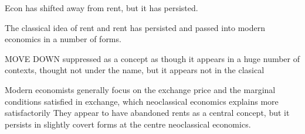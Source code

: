 Econ has shifted away from rent, but it has persisted. 

The classical idea of rent and rent has persisted and passed into modern economics in a number of forms. %

MOVE DOWN suppressed as a concept as though it appears in a huge number of contexts, thought not under the name, but it appears not in the clasical

 Modern economists generally focus  on the exchange price and the marginal conditions satisfied in exchange, which neoclassical economics explains more satisfactorily They appear to have abandoned rents as a central concept, but it  persists in slightly covert forms at the centre  neoclassical economics. 
